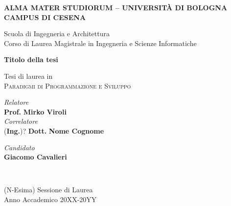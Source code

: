 \begin{titlepage}
	\begin{center}
		\large
		\textbf{ALMA MATER STUDIORUM -- UNIVERSITÀ DI BOLOGNA \\ CAMPUS DI CESENA}
		\\
		\noindent\hrulefill
		\vspace{0.4cm}

		\Large
		Scuola di Ingegneria e Architettura \\
		Corso di Laurea Magistrale in Ingegneria e Scienze Informatiche

		\Huge
		\vspace{4cm}
		\textbf{Titolo della tesi}

		\large
		\vspace{1cm}
		Tesi di laurea in
		\\
		\textsc{Paradigmi di Programmazione e Sviluppo}

		\vspace{5.5cm}
		\begin{minipage}[t]{0.64\textwidth}
			\begin{flushleft}
				\textit{Relatore}
				\\
				\textbf{Prof.} \textbf{Mirko Viroli}
				\\
				\vspace{0.4cm}
				\textit{Correlatore}
				\\
				(\textbf{Ing.})? \textbf{Dott.} \textbf{Nome Cognome}
			\end{flushleft}
		\end{minipage}
		\begin{minipage}[t]{0.34\textwidth}
			\begin{flushright}
				\textit{Candidato}
				\\
				\textbf{Giacomo Cavalieri}
			\end{flushright}
		\end{minipage}\\

		\vfill
		\noindent\hrulefill
		\vspace{0.3cm}
		\Large

		(N-Esima) Sessione di Laurea
		\\
		Anno Accademico 20XX-20YY
	\end{center}
\end{titlepage}
\restoregeometry